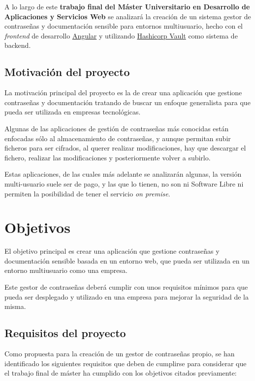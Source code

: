 \documentclass{\ClassPath/viu-tfm-template}
\begin{document}
A lo largo de este \textbf{trabajo final del Máster Universitario en Desarrollo de Aplicaciones y Servicios Web} se analizará la creación de un sistema gestor de contraseñas y documentación sensible para entornos multiusuario, hecho con el \textit{frontend} de desarrollo \href{https://angular.io/}{Angular} y utilizando  \href{https://www.vaultproject.io/}{Hashicorp Vault} como sistema de backend.

\section{Motivación del proyecto}

La motivación principal del proyecto es la de crear una aplicación que gestione contraseñas y documentación tratando de buscar un enfoque generalista para que pueda ser utilizada en empresas tecnológicas.

Algunas de las aplicaciones de gestión de contraseñas más conocidas están enfocadas sólo al almacenamiento de contraseñas, y aunque permitan subir ficheros para ser cifrados, al querer realizar modificaciones, hay que descargar el fichero, realizar las modificaciones y posteriormente volver a subirlo.

Estas aplicaciones, de las cuales más adelante se analizarán algunas, la versión multi-usuario suele ser de pago, y las que lo tienen, no son ni Software Libre ni permiten la posibilidad de tener el servicio \textit{on premise}.



\chapter{Objetivos}

El objetivo principal es crear una aplicación que gestione contraseñas y documentación sensible basada en un entorno web, que pueda ser utilizada en un entorno multiusuario como una empresa.

Este gestor de contraseñas deberá cumplir con unos requisitos mínimos para que pueda ser desplegado y utilizado en una empresa para mejorar la seguridad de la misma.


\section{Requisitos del proyecto}
Como propuesta para la creación de un gestor de contraseñas propio, se han identificado los siguientes requisitos que deben de cumplirse para considerar que el trabajo final de máster ha cumplido con los objetivos citados previamente:
\end{document}
